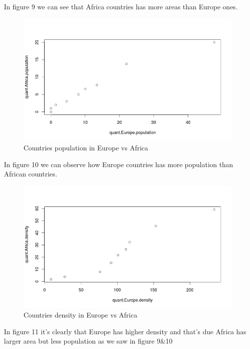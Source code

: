 \documentclass{article}
\begin{document}
	In figure 9 we can see that Africa countries has more areas than Europe ones.
	\begin{figure}[H]
		\begin{center}
			\includegraphics[scale=0.6]{qqplotpopulation.png}
		\end{center}
		\caption{Countries population in Europe vs Africa}
	\end{figure}
	In figure 10 we can observe how Europe countries has more population than African countries.
	\begin{figure}[H]
		\begin{center}
			\includegraphics[scale=0.6]{qqplotdensity.png}
		\end{center}
		\caption{Countries density in Europe vs Africa}
	\end{figure}
	In figure 11 it's clearly that Europe has higher density and that's due Africa has larger area but less population as we saw in figure 9\&10
\end{document}
